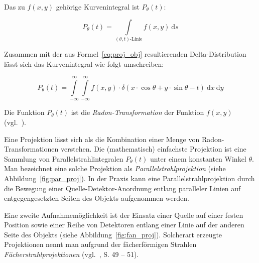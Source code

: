 Das zu $f(x, y)$ gehörige Kurvenintegral ist $P_{\theta}(t)$:

\begin{equation}\label{eq:proj_int}
    P_{\theta}(t) = \int\limits_{(\theta, t)\text{-Linie}} f(x, y)\ \mathrm{d}s
\end{equation}

Zusammen mit der aus Formel~\ref{eq:proj_obj} resultierenden Delta-Distribution lässt sich das Kurvenintegral wie folgt
umschreiben:

\begin{equation}\label{eq:proj_radon}
    P_{\theta}(t) = \int\limits_{-\infty}^{\infty}\int\limits_{-\infty}^{\infty}f(x, y) \cdot \delta(x \cdot
                    \cos \theta + y \cdot \sin \theta - t)\ \mathrm{d} x\ \mathrm{d} y
\end{equation}

Die Funktion $P_{\theta}(t)$ ist die \textit{Radon-Transformation} der Funktion $f(x, y)$ (vgl.~\cite{radon}).

Eine Projektion lässt sich als die Kombination einer Menge von Radon-Transformationen verstehen. Die
(mathematisch) einfachste Projektion ist eine Sammlung von Parallelstrahlintegralen $P_{\theta}(t)$ unter einem
konstanten Winkel $\theta$. Man bezeichnet eine solche Projektion als \textit{Parallelstrahlprojektion} (siehe
Abbildung~\ref{fig:par_proj}). In der Praxis kann eine Parallelstrahlprojektion durch die Bewegung einer
Quelle-Detektor-Anordnung entlang paralleler Linien auf entgegengesetzten Seiten des Objekts aufgenommen werden.

Eine zweite Aufnahmemöglichkeit ist der Einsatz einer Quelle auf einer festen Position sowie einer Reihe von Detektoren
entlang einer Linie auf der anderen Seite des Objekts (siehe Abbildung~\ref{fig:fan_proj}). Solcherart erzeugte
Projektionen nennt man aufgrund der fächerförmigen Strahlen \textit{Fächerstrahlprojektionen} (vgl.~\cite{kakslan},
S. 49 -- 51).

